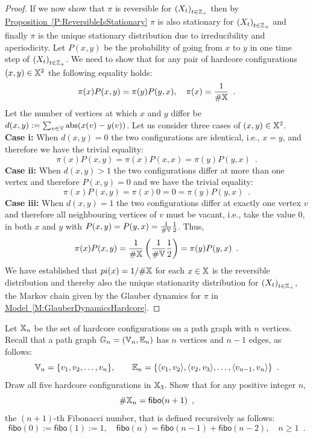 \begin{prop}
\begin{proof}
If we now show that $\pi$ is reversible for $\left( X_t \right)_{t \in \mathbb{Z}_+}$ then by \hyperref[P:ReversibleIsStationary]{Proposition~\ref*{P:ReversibleIsStationary}} $\pi$ is also stationary for $\left( X_t \right)_{t \in \mathbb{Z}_+}$ and finally $\pi$ is the unique stationary distribution due to irreducibility and aperiodicity.  
Let $P(x,y)$ be the probability of going from $x$ to $y$ in one time step of $\left( X_t \right)_{t \in \mathbb{Z}_+}$.  
We need to show that for any pair of hardcore configurations $(x,y) \in \mathbb{X}^2$ the following equality holds:
\[
\pi(x) P(x,y) = \pi(y) P(y,x), \quad \pi(x) = \frac{1}{\#\mathbb{X}} \enspace .
\]
Let the number of vertices at which $x$ and $y$ differ be $d(x,y):= \sum_{v \in \mathbb{V}} {\mathop{\rm abs}}(x(v)-y(v))$.  
Let us consider three cases of $(x,y) \in \mathbb{X}^2$.\\  
{\bf Case i:} When $d(x,y)=0$ the two configurations are identical, i.e., $x=y$, and therefore we have the trivial equality:
\[
\pi(x) P(x,y) =\pi(x) P(x,x)= \pi(y) P(y,x) \enspace .
\]
{\bf Case ii:} When $d(x,y)>1$ the two configurations differ at more than one vertex and therefore $P(x,y)=0$ and we have the trivial equality:
\[
\pi(x) P(x,y) =\pi(x) 0 = 0 = \pi(y) P(y,x) \enspace .
\]
{\bf Case iii:} When $d(x,y)=1$ the two configurations differ at exactly one vertex $v$ and therefore all neighbouring vertices of $v$ must be vacant, i.e., take the value $0$, in both $x$ and $y$ with $P(x,y)=P(y,x)=\frac{1}{\#\mathbb{V}}\frac{1}{2}$.  Thus,
\[
\pi(x) P(x,y) = \frac{1}{\#\mathbb{X}} \left(\frac{1}{\#\mathbb{V}}\frac{1}{2} \right) = \pi(y) P(y,x) \enspace .
\] 
We have established that $pi(x) = 1/\#\mathbb{X}$ for each $x \in \mathbb{X}$ is the reversible distribution and thereby also the unique stationarity distribution for $\left( X_t \right)_{t \in \mathbb{Z}_+}$, the Markov chain given by the Glauber dynamics for $\pi$ in \hyperref[M:GlauberDynamicsHardcore]{Model~\ref*{M:GlauberDynamicsHardcore}}. 
\end{proof}
\end{prop}

\begin{exercise}
Let $\mathbb{X}_n$ be the set of hardcore configurations on a path graph with $n$ vertices.  
Recall that a path graph $\mathbb{G}_n=(\mathbb{V}_n,\mathbb{E}_n)$ has $n$ vertices and $n-1$ edges, as follows: 
\[
\mathbb{V}_n = \{v_1,v_2,\ldots,v_n \}, \qquad \mathbb{E}_n = \{ \langle v_1, v_2 \rangle, \langle v_2, v_3 \rangle, \ldots, \langle v_{n-1}, v_n \rangle \} \enspace .
\]
Draw all five hardcore configurations in $\mathbb{X}_3$.  Show that for any positive integer $n$, 
\[
\# \mathbb{X}_n = \mathsf{fibo}(n+1) \enspace ,
\]
the $(n+1)$-th Fibonacci number, that is defined recursively as follows:
\[
\mathsf{fibo}(0) := \mathsf{fibo}(1) := 1, \quad \mathsf{fibo}(n) = \mathsf{fibo}(n-1)+\mathsf{fibo}(n-2), \quad n \geq 1 \enspace .
\]
\end{exercise}

